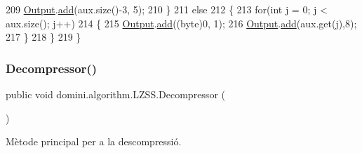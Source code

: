 \begin{DoxyCode}
209             \hyperlink{classdomini_1_1algorithm_1_1Algorithm_a4de9955411c656325adc391ef570c082}{Output}.\hyperlink{classpersistencia_1_1output_1_1Ctrl__Output_a8c5aa5a6acb5259faeb1c05c71ddd21c}{add}(aux.size()-3, 5);
210         \}
211         \textcolor{keywordflow}{else}
212         \{
213             \textcolor{keywordflow}{for}(\textcolor{keywordtype}{int} j = 0; j < aux.size(); j++)
214             \{
215                 \hyperlink{classdomini_1_1algorithm_1_1Algorithm_a4de9955411c656325adc391ef570c082}{Output}.\hyperlink{classpersistencia_1_1output_1_1Ctrl__Output_a8c5aa5a6acb5259faeb1c05c71ddd21c}{add}((byte)0, 1);
216                 \hyperlink{classdomini_1_1algorithm_1_1Algorithm_a4de9955411c656325adc391ef570c082}{Output}.\hyperlink{classpersistencia_1_1output_1_1Ctrl__Output_a8c5aa5a6acb5259faeb1c05c71ddd21c}{add}(aux.get(j),8);
217             \}
218         \}
219     \}
\end{DoxyCode}
\mbox{\label{classdomini_1_1algorithm_1_1LZSS_a665ab942951b839e63dc06e707bba1ad}} 
\subsubsection{\texorpdfstring{Decompressor()}{Decompressor()}}
{\footnotesize\ttfamily public void domini.\+algorithm.\+L\+Z\+S\+S.\+Decompressor (\begin{DoxyParamCaption}{ }\end{DoxyParamCaption})\hspace{0.3cm}{\ttfamily [inline]}}



Mètode principal per a la descompressió. 


